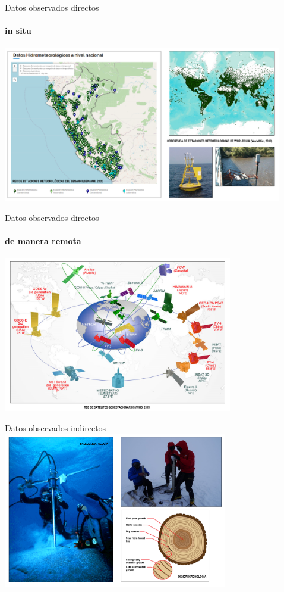 \documentclass{beamer}
\begin{document}
\begin{frame}{Datos observados directos}
\framesubtitle{in situ}
\includegraphics[height=6.8cm]{img/dataobs1.png}
\centering
\end{frame}

\begin{frame}{Datos observados directos}
\framesubtitle{de manera remota}
\includegraphics[height=6.8cm]{img/dataobs2.png}
\centering
\end{frame}

\begin{frame}{Datos observados indirectos}
\includegraphics[height=6.8cm]{img/dataind.png}
\centering
\end{frame}
\end{document}

